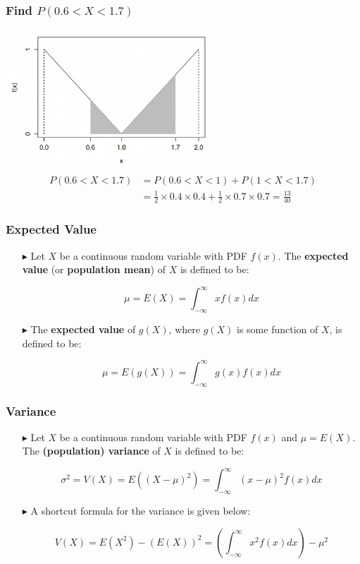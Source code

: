 \documentclass[12pt]{beamer}
\begin{document}
\begin{frame}
	\frametitle{Find $P(0.6<X<1.7)$}
	\centering
	\includegraphics[width=8cm]{pdf8.png}
	\begin{align*}
		P(0.6<X<1.7)&=P(0.6<X<1)+P(1<X<1.7)\\
		&=\frac{1}{2}\times0.4\times0.4+\frac{1}{2}\times0.7\times0.7=\frac{13}{40}
	\end{align*}
\end{frame}
\begin{frame}
	\frametitle{Expected Value}
	
	\begin{itemize}
		\item[\color{blue}$\blacktriangleright$] Let $X$ be a continuous random variable with PDF $f(x)$. The \textbf{expected value} (or \textbf{population mean}) of $X$ is defined to be:
		
		\[\mu = E(X) = \int_{-\infty}^{\infty} x f(x) dx\]
		
		\item[\color{blue}$\blacktriangleright$] The \textbf{expected value} of $g(X)$, where $g(X)$ is some function of $X$, is defined to be:
		
		\[\mu = E(g(X)) = \int_{-\infty}^{\infty} g(x) f(x) dx\]
	\end{itemize}
	
\end{frame}

\begin{frame}
	\frametitle{Variance}
	
	\begin{itemize}
		\item[\color{blue}$\blacktriangleright$] Let $X$ be a continuous random variable with PDF $f(x)$ and $\mu = E(X)$. The \textbf{(population) variance} of $X$ is defined to be:
		
		\[\sigma^2 = V(X) = E((X-\mu)^2) = \int_{-\infty}^{\infty} (x-\mu)^2 f(x)dx\]
		
		\item[\color{blue}$\blacktriangleright$] A shortcut formula for the variance is given below:
		
		\[V(X) = E(X^2) - (E(X))^2 = \left(\int_{-\infty}^{\infty} x^2 f(x)dx\right) - \mu^2\]
	\end{itemize}
	
\end{frame}
\end{document}
